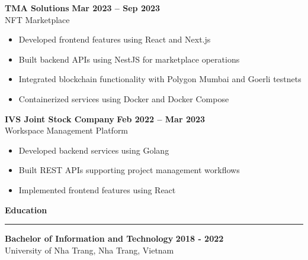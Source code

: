 \documentclass{article}
\newcommand{\separator}{\bigskip\hrule\bigskip}
\newcommand{\sectionheader}[1]{\noindent\large\textbf{#1}\separator}
\newenvironment{bullets}{
    \begin{itemize}
    \setlength{\itemsep}{0pt}
    \setlength{\parskip}{0pt}
    \setlength{\parsep}{0pt}
}{
    \end{itemize}
}
\begin{document}

\textbf{TMA Solutions} \hfill \textbf{Mar 2023 – Sep 2023}\\
NFT Marketplace
\begin{bullets}
    \item Developed frontend features using React and Next.js
    \item Built backend APIs using NestJS for marketplace operations
    \item Integrated blockchain functionality with Polygon Mumbai and Goerli testnets
    \item Containerized services using Docker and Docker Compose
\end{bullets}


\textbf{IVS Joint Stock Company} \hfill \textbf{Feb 2022 – Mar 2023}\\
Workspace Management Platform
\begin{bullets}
    \item Developed backend services using Golang
    \item Built REST APIs supporting project management workflows
    \item Implemented frontend features using React
\end{bullets}


\vspace{0.5cm}
\sectionheader{Education}

\textbf{Bachelor of Information and Technology} \hfill \textbf{2018 - 2022}\\
University of Nha Trang, Nha Trang, Vietnam

\vspace{\baselineskip}
\end{document}
